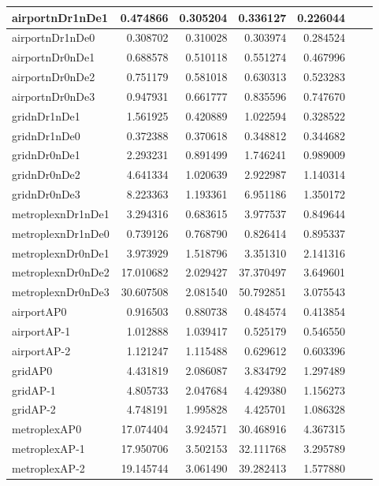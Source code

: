 \begin{longtable}{|l|r|r|r|r|r|r|}
\endlastfoot
airportnDr1nDe1 & 0.474866 & 0.305204 & 0.336127 & 0.226044 \\ \hline
airportnDr1nDe0 & 0.308702 & 0.310028 & 0.303974 & 0.284524 \\ \hline
airportnDr0nDe1 & 0.688578 & 0.510118 & 0.551274 & 0.467996 \\ \hline
airportnDr0nDe2 & 0.751179 & 0.581018 & 0.630313 & 0.523283 \\ \hline
airportnDr0nDe3 & 0.947931 & 0.661777 & 0.835596 & 0.747670 \\ \hline
gridnDr1nDe1 & 1.561925 & 0.420889 & 1.022594 & 0.328522 \\ \hline
gridnDr1nDe0 & 0.372388 & 0.370618 & 0.348812 & 0.344682 \\ \hline
gridnDr0nDe1 & 2.293231 & 0.891499 & 1.746241 & 0.989009 \\ \hline
gridnDr0nDe2 & 4.641334 & 1.020639 & 2.922987 & 1.140314 \\ \hline
gridnDr0nDe3 & 8.223363 & 1.193361 & 6.951186 & 1.350172 \\ \hline
metroplexnDr1nDe1 & 3.294316 & 0.683615 & 3.977537 & 0.849644 \\ \hline
metroplexnDr1nDe0 & 0.739126 & 0.768790 & 0.826414 & 0.895337 \\ \hline
metroplexnDr0nDe1 & 3.973929 & 1.518796 & 3.351310 & 2.141316 \\ \hline
metroplexnDr0nDe2 & 17.010682 & 2.029427 & 37.370497 & 3.649601 \\ \hline
metroplexnDr0nDe3 & 30.607508 & 2.081540 & 50.792851 & 3.075543 \\ \hline
airportAP0 & 0.916503 & 0.880738 & 0.484574 & 0.413854 \\ \hline
airportAP-1 & 1.012888 & 1.039417 & 0.525179 & 0.546550 \\ \hline
airportAP-2 & 1.121247 & 1.115488 & 0.629612 & 0.603396 \\ \hline
gridAP0 & 4.431819 & 2.086087 & 3.834792 & 1.297489 \\ \hline
gridAP-1 & 4.805733 & 2.047684 & 4.429380 & 1.156273 \\ \hline
gridAP-2 & 4.748191 & 1.995828 & 4.425701 & 1.086328 \\ \hline
metroplexAP0 & 17.074404 & 3.924571 & 30.468916 & 4.367315 \\ \hline
metroplexAP-1 & 17.950706 & 3.502153 & 32.111768 & 3.295789 \\ \hline
metroplexAP-2 & 19.145744 & 3.061490 & 39.282413 & 1.577880 \\ \hline

\end{longtable}
